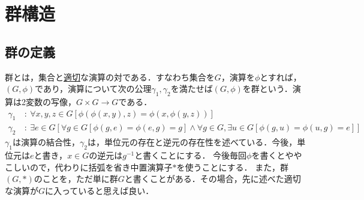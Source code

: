 \documentclass[dvipdfmx,12pt]{jsarticle}
\date{}
\begin{document}

\section*{群構造}
\subsection*{群の定義}
群とは，集合と\underline{適切}な演算の対である．すなわち集合を$G$，演算を$\phi$とすれば，$(G,\phi)$であり，演算について次の公理$\gamma_1 , \gamma_2$を満たせば$(G,\phi)$を群という．演算は2変数の写像，$G \times G \to G$である．
\begin{align*}
\gamma_1\ &:\ \forall x,y,z \in G[\phi(\phi(x,y),z) = \phi(x,\phi(y,z))] \\
\gamma_2\ &: \ \exists e \in G [\forall g \in G[\phi(g,e) = \phi(e,g) = g] \land \forall g \in G , \exists u \in G[\phi(g,u) = \phi(u,g) = e]]
\end{align*}
$\gamma_1$は演算の結合性，$\gamma_2$は，単位元の存在と逆元の存在性を述べている．今後，単位元は$e$と書き，$x \in G$の逆元は$g^{-1}$と書くことにする．
今後毎回$\phi$を書くとややこしいので，代わりに括弧を省き中置演算子$*$を使うことにする．
また，群$(G,*)$のことを，ただ単に群$G$と書くことがある．その場合，先に述べた適切な演算が$G$に入っていると思えば良い．
\end{document}
